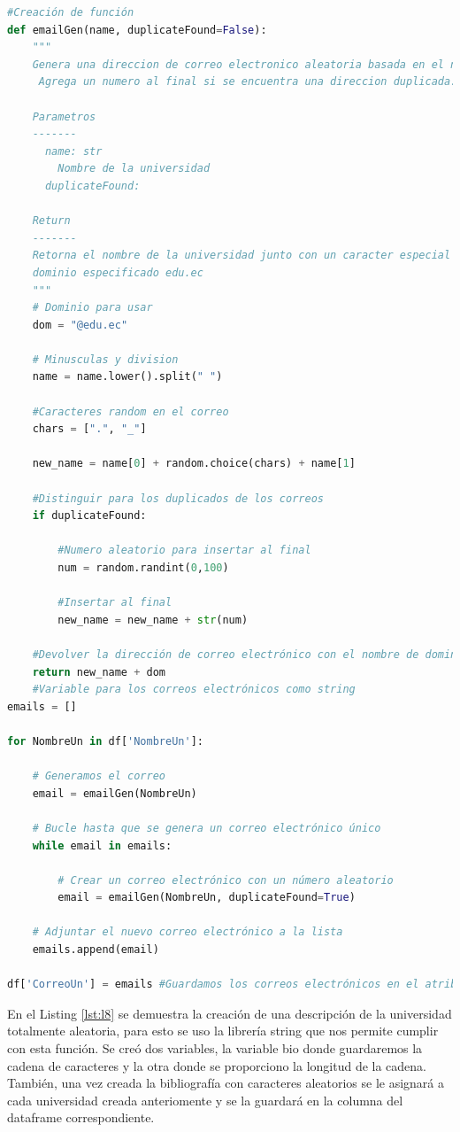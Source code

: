 \documentclass[10pt, oneside,spanish]{article}   	%
\begin{document}
\begin{lstlisting}[language=Python,label={lst:l7},caption=Atributo CorreoUn de la entidad Universidad,frame=single, ]
#Creación de función
def emailGen(name, duplicateFound=False):
    """
    Genera una direccion de correo electronico aleatoria basada en el nombre dado.
     Agrega un numero al final si se encuentra una direccion duplicada.

    Parametros
    -------
      name: str
        Nombre de la universidad
      duplicateFound: 

    Return
    -------
    Retorna el nombre de la universidad junto con un caracter especial y el 
    dominio especificado edu.ec
    """
    # Dominio para usar
    dom = "@edu.ec"
    
    # Minusculas y division
    name = name.lower().split(" ")
    
    #Caracteres random en el correo
    chars = [".", "_"]
    
    new_name = name[0] + random.choice(chars) + name[1] 
    
    #Distinguir para los duplicados de los correos
    if duplicateFound:
        
        #Numero aleatorio para insertar al final
        num = random.randint(0,100)
        
        #Insertar al final
        new_name = new_name + str(num)
        
    #Devolver la dirección de correo electrónico con el nombre de dominio adjunto
    return new_name + dom
    #Variable para los correos electrónicos como string
emails = []

for NombreUn in df['NombreUn']: 
    
    # Generamos el correo
    email = emailGen(NombreUn)
    
    # Bucle hasta que se genera un correo electrónico único
    while email in emails:
        
        # Crear un correo electrónico con un número aleatorio
        email = emailGen(NombreUn, duplicateFound=True)
    
    # Adjuntar el nuevo correo electrónico a la lista
    emails.append(email)
    
df['CorreoUn'] = emails #Guardamos los correos electrónicos en el atributo CorreoUn
\end{lstlisting}
En el Listing \ref{lst:l8} se demuestra la creación de una descripción de la universidad totalmente aleatoria, para esto se uso la librería string que nos permite cumplir con esta función. Se creó dos variables, la variable bio donde guardaremos la cadena de caracteres y la otra donde se proporciono la longitud de la cadena. También, una vez creada la bibliografía con caracteres aleatorios se le asignará a cada universidad creada anteriomente y se la guardará en la columna del dataframe correspondiente.
\end{document}
